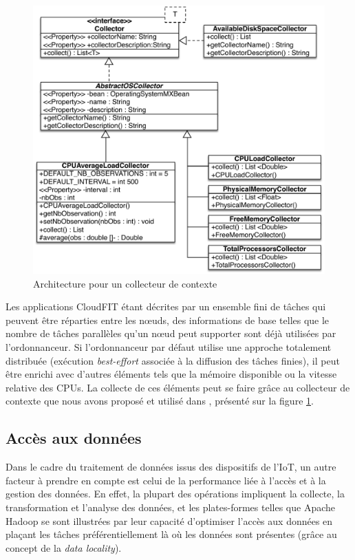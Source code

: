 \begin{figure} [!hbt]
	\centering
	\includegraphics[width=1\linewidth]{img/CollectorUML2.pdf}
	\caption{Architecture pour un collecteur de contexte \cite{Cassales2015202}}
	\label{fig:CollectorDiag}
\end{figure}


Les applications CloudFIT étant décrites par un ensemble fini de tâches qui peuvent être réparties entre les n\oe{}uds, des informations de base telles que le nombre de tâches parallèles qu'un n\oe{}ud peut supporter sont déjà utilisées par l'ordonnanceur. Si l'ordonnanceur par défaut utilise une approche totalement distribuée (exécution \textit{best-effort} associée à la diffusion des tâches finies), il peut être enrichi avec d'autres éléments tels que la mémoire disponible ou la vitesse relative des CPUs. La collecte de ces éléments peut se faire grâce au collecteur de contexte que nous avons proposé et utilisé dans \cite{Cassales2016}, présenté sur la figure \ref{fig:CollectorDiag}.



\subsection{Accès aux données}
%
Dans le cadre du traitement de données issus des dispositifs de l'IoT, un autre facteur à prendre en compte est celui de la performance liée à l'accès et à la gestion des données. En effet, la plupart des opérations impliquent la collecte, la transformation et l'analyse des données, et les plates-formes telles que Apache Hadoop se sont illustrées par leur capacité d'optimiser l'accès aux données en plaçant les tâches préférentiellement là où les données sont présentes (grâce au concept de la \textit{data locality}). 

